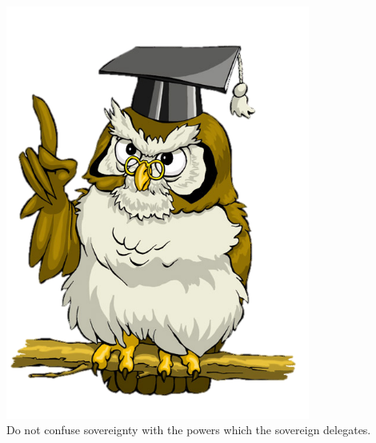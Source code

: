 %
%

\begin{frame}
    \begin{columns}[c]
            \centering
            \includegraphics[width=0.75\textwidth]{img/owl.png} \\
        \column{0.5\textheight}
            \Large{Do not confuse sovereignty with the powers which the sovereign delegates.}
    \end{columns}
\end{frame}

